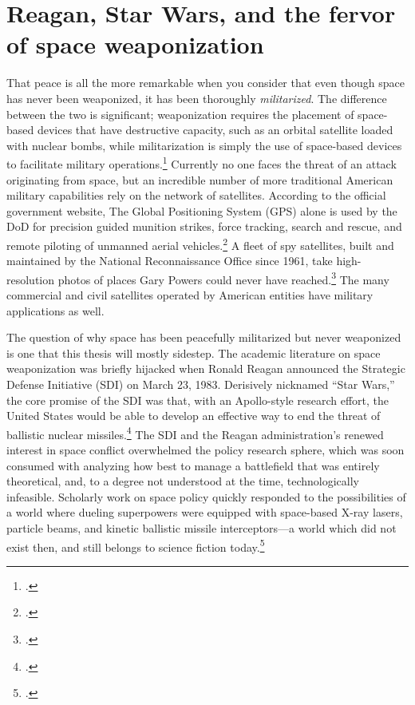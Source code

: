 \documentclass{report}
\begin{document}
\section{Reagan, Star Wars, and the fervor of space weaponization}
That peace is all the more remarkable when you consider that even though space has never been weaponized, it has been thoroughly \emph{militarized}. The difference between the two is significant; weaponization requires the placement of space-based devices that have destructive capacity, such as an orbital satellite loaded with nuclear bombs, while militarization is simply the use of space-based devices to facilitate military operations.\footcite[p.~3]{mowthorpe_militarization_2004} Currently no one faces the threat of an attack originating from space, but an incredible number of more traditional American military capabilities rely on the network of satellites. According to the official government website, The Global Positioning System (GPS) alone is used by the DoD for precision guided munition strikes, force tracking, search and rescue, and remote piloting of unmanned aerial vehicles.\footcite{national_coordination_office_for_space-based_positioning_navigation_and_timing_federal_2018} A fleet of spy satellites, built and maintained by the National Reconnaissance Office since 1961, take high-resolution photos of places Gary Powers could never have reached.\footcite{national_reconnaissance_office_about_2019} The many commercial and civil satellites operated by American entities have military applications as well.

The question of why space has been peacefully militarized but never weaponized is one that this thesis will mostly sidestep. The academic literature on space weaponization was briefly hijacked when Ronald Reagan announced the Strategic Defense Initiative (SDI) on March 23, 1983. Derisively nicknamed ``Star Wars,'' the core promise of the SDI was that, with an Apollo-style research effort, the United States would be able to develop an effective way to end the threat of ballistic nuclear missiles.\footcite{reagan_address_1983} The SDI and the Reagan administration's renewed interest in space conflict overwhelmed the policy research sphere, which was soon consumed with analyzing how best to manage a battlefield that was entirely theoretical, and, to a degree not understood at the time, technologically infeasible. Scholarly work on space policy quickly responded to the possibilities of a world where dueling superpowers were equipped with space-based X-ray lasers, particle beams, and kinetic ballistic missile interceptors---a world which did not exist then, and still belongs to science fiction today.\footcite[p.~1-2]{moorhead_work_2013}
\end{document}

